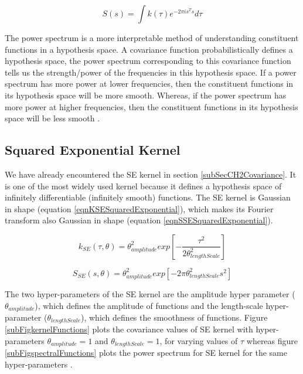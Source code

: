 \begin{equation}\label{eqCh4StationaryPowerSpectrum}
    S(s) = \int k(\tau) e^{-2 \pi is^{T} s}d\tau 
\end{equation}

The power spectrum is a more interpretable method of understanding constituent functions in a hypothesis space. A covariance function probabilistically defines a hypothesis space, the power spectrum corresponding to this covariance function tells us the strength/power of the frequencies in this hypothesis space. If a power spectrum has more power at lower frequencies, then the constituent functions in its hypothesis space will be more smooth. Whereas, if the power spectrum has more power at higher frequencies, then the constituent functions in its hypothesis space will be less smooth \cite{wilson2014thesis}. 

\subsection{Squared Exponential Kernel}\label{subSecCh4SEKernel}
We have already encountered the SE kernel in section \ref{subSecCH2Covariance}. It is one of the most widely used kernel because it defines a hypothesis space of infinitely differentiable (infinitely smooth) functions. The SE kernel is Gaussian in shape (equation \ref{eqnKSESquaredExponential}), which makes its Fourier transform also Gaussian in shape (equation \ref{eqnSSESquaredExponential}).  

\begin{equation}\label{eqnKSESquaredExponential}
k_{SE}(\tau, \theta) = \theta_{amplitude}^2exp[-\frac{\tau^2}{2\theta_{lengthScale}^2}]
\end{equation}

\begin{equation}\label{eqnSSESquaredExponential}
S_{SE}(s, \theta) = \theta_{amplitude}^2  exp[-2\pi \theta_{lengthScale}^2 s^2]
\end{equation}

The two hyper-parameters of the SE kernel are the amplitude hyper parameter ($\theta_{amplitude}$), which defines the amplitude of functions and the length-scale hyper-parameter ($\theta_{lengthScale}$), which defines the smoothness of functions. Figure \ref{subFigkernelFunctions} plots the covariance values of SE kernel with hyper-parameters $\theta_{amplitude}=1$ and $\theta_{lengthScale}=1$, for varying values of $\tau$ whereas figure \ref{subFigspectralFunctions} plots the power spectrum for SE kernel for the same hyper-parameters . 


